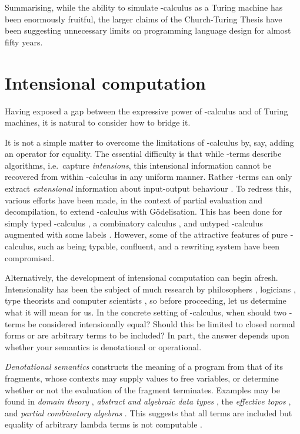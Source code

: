 \documentclass[a4paper]{article}
\begin{document}
Summarising, while the ability to simulate -calculus as a Turing
machine has been enormously fruitful, the larger claims of the
Church-Turing Thesis have been suggesting unnecessary limits on
programming language design for almost fifty years.

\section{Intensional computation} 
\label{sec:intensional}

Having exposed a gap between the expressive power of -calculus and
of Turing machines, it is natural to consider how to bridge it. 

It is not a simple matter to overcome the limitations of -calculus
by, say, adding an operator for equality.  The essential difficulty is
that while -terms describe algorithms, i.e.\ capture {\em
  intensions}, this intensional information cannot be recovered from
within -calculus in any uniform manner.  Rather -terms can
only extract {\em extensional} information about input-output
behaviour \cite[page 2]{Church41}.  To redress this, various efforts
have been made, in the context of partial evaluation and
decompilation, to extend -calculus with G\"odelisation.  This has
been done for simply typed -calculus
\cite{Berger-Schwichtenberg91}, a combinatory calculus
\cite{goldberg2000godelization}, and untyped -calculus augmented
with some labels \cite{goedelization:mogensen:PEPM99}.  However, some
of the attractive features of pure -calculus, such as being
typable, confluent, and a rewriting system have been compromised.

Alternatively, the development of intensional computation can begin
afresh.  Intensionality has been the subject of much research by
philosophers \cite{Montague60,feferman60,cellucci81,katz01}, logicians
\cite{frege1892,tichy69,Brouwer81}, type theorists \cite{lof,muskens2007,bove2009brief} and computer scientists
\cite{hobbs78,ArtemovB07,carette12}, so before proceeding, let us
determine what it will mean for us. In the concrete setting of
-calculus, when should two -terms be considered intensionally
equal? Should this be limited to closed normal forms or are arbitrary
terms to be included? In part, the answer depends upon whether your
semantics is denotational or operational.

{\em Denotational semantics} constructs the meaning of a program from that
of its fragments, whose contexts may supply values to free variables,
or determine whether or not the evaluation of the fragment terminates.
Examples may be found in {\em domain theory} \cite{Kreisel69,
  Scott76}, {\em abstract and algebraic data types} \cite{ADJ77,
  Mitchell88}, the {\em effective topos} \cite{Hyland82}, and {\em
  partial combinatory algebras} \cite{pca, CockettH08,Longley14}.
This suggests that all terms are included but equality of arbitrary
lambda terms is not computable \cite[page 519]{Bare84a}.
\end{document}
